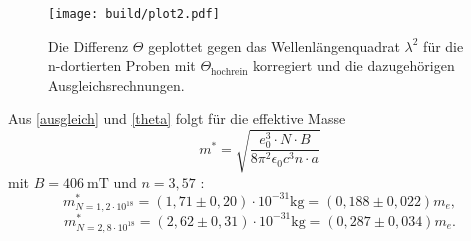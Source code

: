 \begin{figure}
    \texttt{[image: build/plot2.pdf]}
    \caption{Die Differenz $\Theta$ geplottet gegen das Wellenlängenquadrat $\lambda^2$
    für die n-dortierten Proben mit $\Theta_\text{hochrein}$ korregiert
    und die dazugehörigen Ausgleichsrechnungen.}
    \label{plot2}
\end{figure}

\noindent Aus \eqref{ausgleich} und \eqref{theta} folgt für die effektive Masse
\begin{equation}
    m^* = \sqrt{\frac{e^3_0 \cdot N \cdot B}{8 \pi^2 \epsilon_0 c^3 n \cdot a}}
\end{equation}
\noindent mit $B= \qty{406}{\milli \tesla }$ und $n= 3,57$ \cite{Galliumarsenid_n}:
\begin{equation*}
    m^*_{N=1,2 \cdot 10^{18}} = (1,71 \pm 0,20) \cdot 10^{-31} \si{\kg} 
    =  (0,188 \pm 0,022 )m_e,
\end{equation*}
\begin{equation*}
    m^*_{N=2,8 \cdot 10^{18}} = (2,62 \pm 0,31) \cdot 10^{-31} \si{\kg} 
    =  (0,287 \pm 0,034 )m_e.
\end{equation*}
